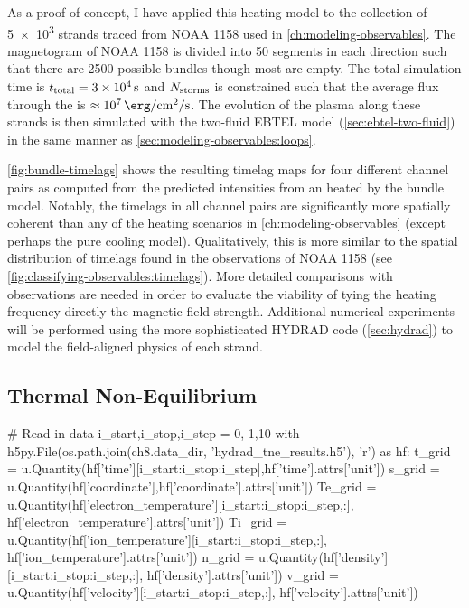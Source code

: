 As a proof of concept, I have applied this heating model to the collection of \num{5e3} strands traced from NOAA 1158 used in \autoref{ch:modeling-observables}. The magnetogram of NOAA 1158 is divided into 50 segments in each direction such that there are 2500 possible bundles though most are empty. The total simulation time is $t_\textup{total}=\SI{3e4}{\second}$ and $N_\textup{storms}$ is constrained such that the average flux through the \AR{} is $\approx\SI{e7}{\erg\per\square\cm\per\second}$. The evolution of the plasma along these strands is then simulated with the two-fluid EBTEL model (\autoref{sec:ebtel-two-fluid}) in the same manner as \autoref{sec:modeling-observables:loops}.

\autoref{fig:bundle-timelags} shows the resulting timelag maps for four different channel pairs as computed from the predicted intensities from an \AR{} heated by the bundle model. Notably, the timelags in all channel pairs are significantly more spatially coherent than any of the heating scenarios in \autoref{ch:modeling-observables} (except perhaps the pure cooling model). Qualitatively, this is more similar to the spatial distribution of timelags found in the observations of NOAA 1158 (see \autoref{fig:classifying-observables:timelags}). More detailed comparisons with observations are needed in order to evaluate the viability of tying the heating frequency directly the magnetic field strength. Additional numerical experiments will be performed using the more sophisticated HYDRAD code (\autoref{sec:hydrad}) to model the field-aligned physics of each strand.

\subsection{Thermal Non-Equilibrium}\label{sec:tne}

\begin{pycode}[chapter8]
# Read in data
i_start,i_stop,i_step = 0,-1,10
with h5py.File(os.path.join(ch8.data_dir, 'hydrad_tne_results.h5'), 'r') as hf:
    t_grid = u.Quantity(hf['time'][i_start:i_stop:i_step],hf['time'].attrs['unit'])
    s_grid = u.Quantity(hf['coordinate'],hf['coordinate'].attrs['unit'])
    Te_grid = u.Quantity(hf['electron_temperature'][i_start:i_stop:i_step,:],
                         hf['electron_temperature'].attrs['unit'])
    Ti_grid = u.Quantity(hf['ion_temperature'][i_start:i_stop:i_step,:],
                         hf['ion_temperature'].attrs['unit'])
    n_grid = u.Quantity(hf['density'][i_start:i_stop:i_step,:],
                        hf['density'].attrs['unit'])
    v_grid = u.Quantity(hf['velocity'][i_start:i_stop:i_step,:],
                        hf['velocity'].attrs['unit'])
\end{pycode}

